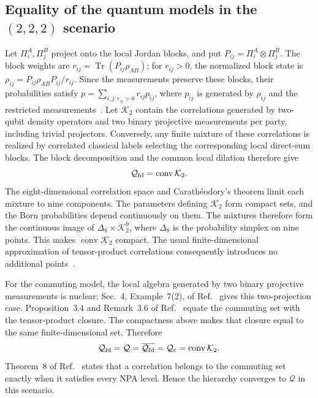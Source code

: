 \documentclass[aps,prl,onecolumn,10pt,superscriptaddress,nofootinbib,longbibliography]{revtex4-2}
\theoremstyle{remark}
\newcommand{\Tr}{\operatorname{Tr}}
\newcommand{\Q}{\mathcal Q}
\begin{document}
\subsection{Equality of the quantum models in the \texorpdfstring{$(2,2,2)$}{(2,2,2)} scenario}
\label{supp:subsec:models}

Let $\Pi_i^A,\Pi_j^B$ project onto the local Jordan blocks, and put $P_{ij}=\Pi_i^A\otimes\Pi_j^B$. The block weights are $r_{ij}=\Tr(P_{ij}\rho_{AB})$; for $r_{ij}>0$, the normalized block state is $\rho_{ij}=P_{ij}\rho_{AB}P_{ij}/r_{ij}$. Since the measurements preserve these blocks, their probabilities satisfy $p=\sum_{i,j:r_{ij}>0}r_{ij}p_{ij}$, where $p_{ij}$ is generated by $\rho_{ij}$ and the restricted measurements~\cite[Eqs.~(12)--(15)]{Masanes2005}. Let $\mathcal K_2$ contain the correlations generated by two-qubit density operators and two binary projective measurements per party, including trivial projectors. Conversely, any finite mixture of these correlations is realized by correlated classical labels selecting the corresponding local direct-sum blocks. The block decomposition and the common local dilation therefore give
\begin{equation}
\mathcal Q_{\rm fd}=\operatorname{conv}\mathcal K_2.
\label{supp:eq:finite-convex-qubit-model}
\end{equation}
The eight-dimensional correlation space and Carath\'eodory's theorem limit each mixture to nine components. The parameters defining $\mathcal K_2$ form compact sets, and the Born probabilities depend continuously on them. The mixtures therefore form the continuous image of $\Delta_8\times\mathcal K_2^9$, where $\Delta_8$ is the probability simplex on nine points. This makes $\operatorname{conv}\mathcal K_2$ compact. The usual finite-dimensional approximation of tensor-product correlations consequently introduces no additional points~\cite{ScholzWerner2008}.

For the commuting model, the local algebra generated by two binary projective measurements is nuclear; Sec.~4, Example~7(2), of Ref.~\cite{ScholzWerner2008} gives this two-projection case. Proposition~3.4 and Remark~3.6 of Ref.~\cite{Fritz2012} equate the commuting set with the tensor-product closure. The compactness above makes that closure equal to the same finite-dimensional set. Therefore
\begin{equation}
\mathcal Q_{\rm fd}=\Q=\overline{\mathcal Q_{\rm fd}}
=\mathcal Q_{\rm c}=\operatorname{conv}\mathcal K_2.
\label{supp:eq:quantum-model-equality}
\end{equation}
Theorem~8 of Ref.~\cite{NPA2008} states that a correlation belongs to the commuting set exactly when it satisfies every NPA level. Hence the hierarchy converges to $\Q$ in this scenario.
\end{document}
